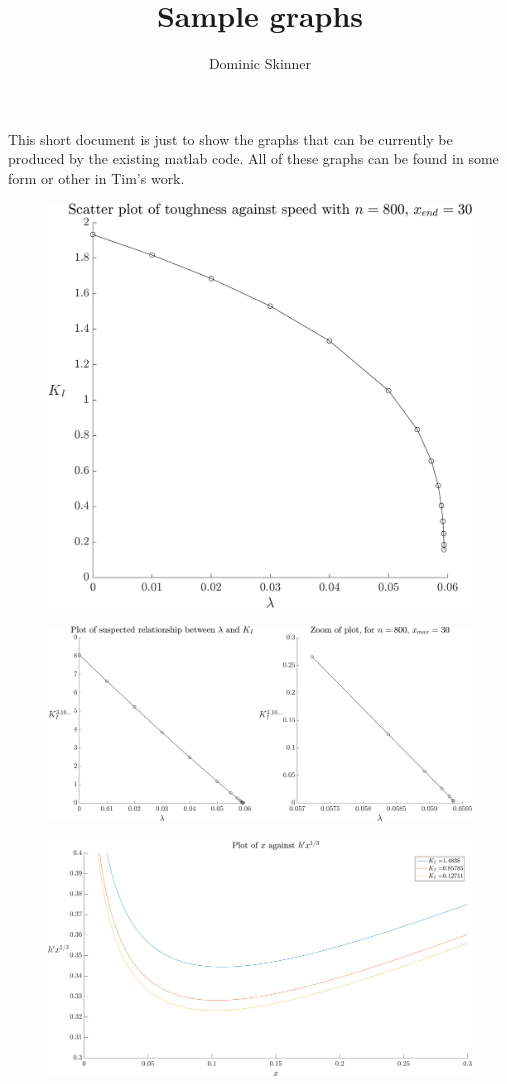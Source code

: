 \documentclass{article}
\begin{document}
\title{Sample graphs}
\author{Dominic Skinner}
\maketitle
This short document is just to show the graphs that can be
currently be produced by the existing matlab code. All of these
graphs can be found in some form or other in Tim's work.
\begin{figure}[ht]\centering
\includegraphics[scale=0.35]{K-lambda.png}
\end{figure}
\begin{figure}[ht]\centering
\includegraphics[scale=0.28]{sus-relation.png}
\end{figure}
\begin{figure}[ht]\centering
\includegraphics[scale=0.28]{hprime-x.png}
\end{figure}
\end{document}
